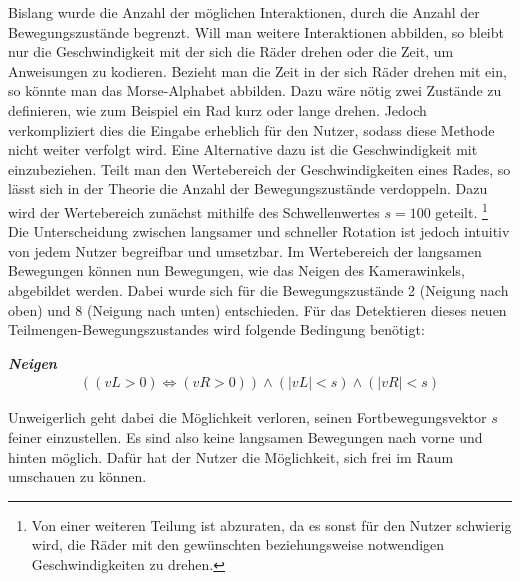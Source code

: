 Bislang wurde die Anzahl der möglichen Interaktionen, durch die Anzahl der Bewegungszustände begrenzt.
Will man weitere Interaktionen abbilden, so bleibt nur die Geschwindigkeit mit der sich die Räder drehen oder die Zeit, um Anweisungen zu kodieren.
Bezieht man die Zeit in der sich Räder drehen mit ein, so könnte man das Morse-Alphabet abbilden. Dazu wäre nötig zwei Zustände zu definieren, wie zum Beispiel ein Rad kurz oder lange drehen.
Jedoch verkompliziert dies die Eingabe erheblich für den Nutzer, sodass diese Methode nicht weiter verfolgt wird.
Eine Alternative dazu ist die Geschwindigkeit mit einzubeziehen.
Teilt man den Wertebereich der Geschwindigkeiten eines Rades, so lässt sich in der Theorie die Anzahl der Bewegungszustände verdoppeln.
Dazu wird der Wertebereich zunächst mithilfe des Schwellenwertes $s = 100$ geteilt.
\footnote{Von einer weiteren Teilung ist abzuraten, da es sonst für den Nutzer schwierig wird, die Räder mit den gewünschten beziehungsweise notwendigen Geschwindigkeiten zu drehen.}
Die Unterscheidung zwischen langsamer und schneller Rotation ist jedoch intuitiv von jedem Nutzer begreifbar und umsetzbar.
Im Wertebereich der langsamen Bewegungen können nun Bewegungen, wie das Neigen des Kamerawinkels, abgebildet werden.
Dabei wurde sich für die Bewegungszustände 2 (Neigung nach oben) und 8 (Neigung nach unten) entschieden.
Für das Detektieren dieses neuen Teilmengen-Bewegungszustandes wird folgende Bedingung benötigt:

\textbf{\textit{Neigen}}\\
\begin{align}
    ((vL > 0) \Leftrightarrow (vR > 0))  \land (|vL| < s) \land (|vR| < s)
\end{align}

Unweigerlich geht dabei die Möglichkeit verloren, seinen Fortbewegungsvektor $s$ feiner einzustellen.
Es sind also keine langsamen Bewegungen nach vorne und hinten möglich.
Dafür hat der Nutzer die Möglichkeit, sich frei im Raum umschauen zu können.

